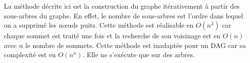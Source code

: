 \newline
La m\'ethode d\'ecrite ici est la construction du graphe it\'erativement \`a partir des sous-arbres du graphe. 
En effet, le nombre de sous-arbres est l'ordre dans lequel on a supprim\'e les n\oe uds puits. 
Cette m\'ethode est r\'ealisable en $O(n^2)$ car chaque sommet est trait\'e une fois et la recherche de son voisinage est en $O(n)$ avec $n$ le nombre de sommets.
\newline 
Cette m\'ethode est inadapt\'ee pour un DAG car sa complexit\'e est en $O(n^n)$.
Elle ne s'ex\'ecute que sur des arbres.
\newline